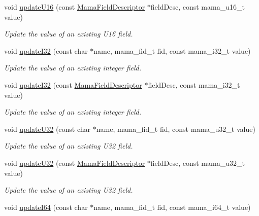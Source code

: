 \begin{DoxyCompactItemize}
void \hyperlink{classWombat_1_1MamaMsg_a451769347694f20b71f7336d74878d1e}{updateU16} (const \hyperlink{classWombat_1_1MamaFieldDescriptor}{MamaFieldDescriptor} $\ast$fieldDesc, const mama\_\-u16\_\-t value)
\begin{DoxyCompactList}\small\item\em Update the value of an existing U16 field. \item\end{DoxyCompactList}\item 
void \hyperlink{classWombat_1_1MamaMsg_aba18342b2417df030f35d1df366e4cdf}{updateI32} (const char $\ast$name, mama\_\-fid\_\-t fid, const mama\_\-i32\_\-t value)
\begin{DoxyCompactList}\small\item\em Update the value of an existing integer field. \item\end{DoxyCompactList}\item 
void \hyperlink{classWombat_1_1MamaMsg_a9917c997e9a274687c13050b3a0485e3}{updateI32} (const \hyperlink{classWombat_1_1MamaFieldDescriptor}{MamaFieldDescriptor} $\ast$fieldDesc, const mama\_\-i32\_\-t value)
\begin{DoxyCompactList}\small\item\em Update the value of an existing integer field. \item\end{DoxyCompactList}\item 
void \hyperlink{classWombat_1_1MamaMsg_a2081687a0dee235b801219656cb89d38}{updateU32} (const char $\ast$name, mama\_\-fid\_\-t fid, const mama\_\-u32\_\-t value)
\begin{DoxyCompactList}\small\item\em Update the value of an existing U32 field. \item\end{DoxyCompactList}\item 
void \hyperlink{classWombat_1_1MamaMsg_aed8f745dc934fd0c89cfe12a535eea7b}{updateU32} (const \hyperlink{classWombat_1_1MamaFieldDescriptor}{MamaFieldDescriptor} $\ast$fieldDesc, const mama\_\-u32\_\-t value)
\begin{DoxyCompactList}\small\item\em Update the value of an existing U32 field. \item\end{DoxyCompactList}\item 
void \hyperlink{classWombat_1_1MamaMsg_a42dacab96197c1d240f8a043972b4a24}{updateI64} (const char $\ast$name, mama\_\-fid\_\-t fid, const mama\_\-i64\_\-t value)

\end{DoxyCompactItemize}
